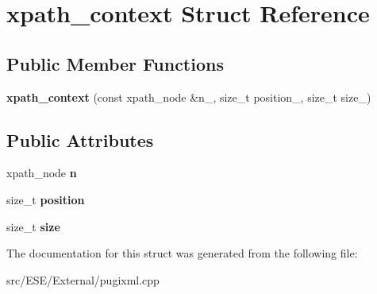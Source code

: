 \hypertarget{structxpath__context}{\section{xpath\-\_\-context Struct Reference}
\label{structxpath__context}
}
\subsection*{Public Member Functions}
\begin{DoxyCompactItemize}
\item 
\hypertarget{structxpath__context_ab5d7a8d5a14ef695b93e15cfb0e20386}{{\bfseries xpath\-\_\-context} (const xpath\-\_\-node \&n\-\_\-, size\-\_\-t position\-\_\-, size\-\_\-t size\-\_\-)}\label{structxpath__context_ab5d7a8d5a14ef695b93e15cfb0e20386}

\end{DoxyCompactItemize}
\subsection*{Public Attributes}
\begin{DoxyCompactItemize}
\item 
\hypertarget{structxpath__context_ace8fbb8121820bc5054605c166101273}{xpath\-\_\-node {\bfseries n}}\label{structxpath__context_ace8fbb8121820bc5054605c166101273}

\item 
\hypertarget{structxpath__context_add1fc9bd16b21d3a8d7a4bd63c60af07}{size\-\_\-t {\bfseries position}}\label{structxpath__context_add1fc9bd16b21d3a8d7a4bd63c60af07}

\item 
\hypertarget{structxpath__context_a976ffb0eff84a7779c97e589c1785d1c}{size\-\_\-t {\bfseries size}}\label{structxpath__context_a976ffb0eff84a7779c97e589c1785d1c}

\end{DoxyCompactItemize}


The documentation for this struct was generated from the following file\-:\begin{DoxyCompactItemize}
\item 
src/\-E\-S\-E/\-External/pugixml.\-cpp\end{DoxyCompactItemize}
